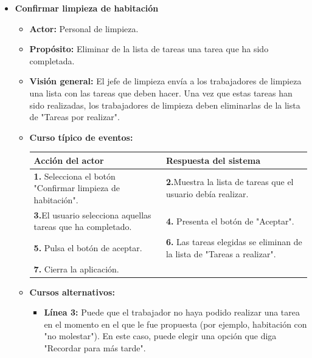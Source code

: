 \documentclass[spanish,a4paper,12pt]{report}		%
\begin{document}
\begin{itemize}
	
		\item \textbf{Confirmar limpieza de habitación}
			\begin{itemize}
			\item \textbf{Actor: }Personal de limpieza.
			\item \textbf{Propósito: }Eliminar de la lista de tareas una tarea que ha sido completada.
			\item \textbf{Visión general: }El jefe de limpieza envía a los trabajadores de limpieza una lista con las tareas que deben hacer. Una vez que estas tareas han sido realizadas, los trabajadores de limpieza deben eliminarlas de la lista de "Tareas por realizar".
			\item \textbf{Curso típico de eventos:}\\ 	%
				\begin{tabular}{|p{6cm}||p{6cm}|}
					\hline
					\textbf{Acción del actor} & \textbf{Respuesta del sistema} \\ \hline \hline
					\textbf{1.} Selecciona el botón  "Confirmar limpieza de habitación". & \textbf{2.}Muestra la lista de tareas que el usuario debía realizar.\\ \hline 
					\textbf{3.}El usuario selecciona aquellas tareas que ha completado. & \textbf{4.} Presenta el botón de "Aceptar".\\ \hline
					\textbf{5.} Pulsa el botón de aceptar. & \textbf{6.} Las tareas elegidas se eliminan de la lista de "Tareas a realizar". \\ \hline
					\textbf{7.} Cierra la aplicación.	& \\ \hline	
				\end{tabular}
			\item \textbf{Cursos alternativos:} 
				\begin{itemize}
					\item \textbf{Línea 3: } Puede que el trabajador no haya podido realizar una tarea en el momento en el que le fue propuesta (por ejemplo, habitación con "no molestar").
 En este caso, puede elegir una opción que diga "Recordar para más tarde".
				\end{itemize}
		\end {itemize}%



\end{itemize}
\end{document}
